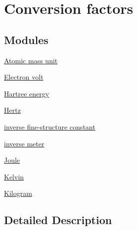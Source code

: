 \hypertarget{group___conversion_factors}{}\section{Conversion factors}
\label{group___conversion_factors}
\subsection*{Modules}
\begin{DoxyCompactItemize}
\item 
\hyperlink{group___atomic_mass_unit}{Atomic mass unit}
\item 
\hyperlink{group___electron_volt}{Electron volt}
\item 
\hyperlink{group___hartree}{Hartree energy}
\item 
\hyperlink{group___hertz}{Hertz}
\item 
\hyperlink{group___inverse_fine_structure_constant}{inverse fine-\/structure constant}
\item 
\hyperlink{group___inverse_meter}{inverse meter}
\item 
\hyperlink{group___joule}{Joule}
\item 
\hyperlink{group___kelvin}{Kelvin}
\item 
\hyperlink{group___kilogram}{Kilogram}
\end{DoxyCompactItemize}


\subsection{Detailed Description}
